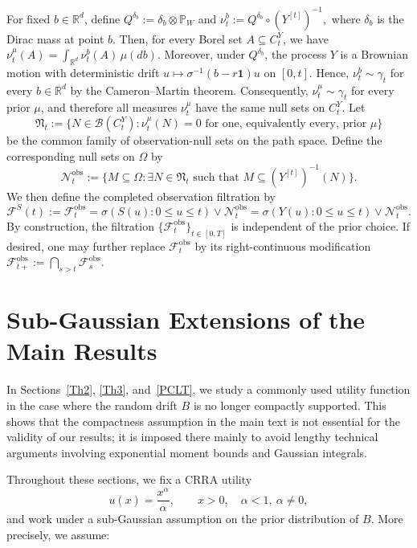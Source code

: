 \documentclass[11pt]{article}
\theoremstyle{definition}
\begin{document}
{For fixed $b\in\mathbb R^d$, define ${Q}^{\delta_b}
:=
\delta_b\otimes\mathbb{P}_W$ and $\nu_t^b
:=
{Q}^{\delta_b}\circ(Y^{[t]})^{-1},$
where $\delta_b$ is the Dirac mass at point $b$.
Then, for every Borel set $A\subseteq C_t^Y$, we have $\nu_t^\mu(A)
=
\int_{\mathbb R^d}\nu_t^b(A)\,\mu(db).$
Moreover, under ${Q}^{\delta_b}$, the process $Y$ is a Brownian
motion with deterministic drift
$u\mapsto\sigma^{-1}(b-r\mathbf 1)u$ on $[0,t]$.
Hence, $\nu_t^b\sim\gamma_t$
for every $b\in\mathbb R^d$ by the Cameron--Martin theorem.
Consequently, $\nu_t^\mu\sim\gamma_t$
for every prior $\mu$, and therefore all measures $\nu_t^\mu$ have the
same null sets on $C_t^Y$.
Let
\[
\mathfrak N_t
:=
\bigl\{
N\in\mathcal B(C_t^Y):
\nu_t^\mu(N)=0
\text{ for one, equivalently every, prior }\mu
\bigr\}
\]
be the common family of observation-null sets on the path space. Define
the corresponding null sets on $\Omega$ by
\[
\mathcal N_t^{\mathrm{obs}}
:=
\bigl\{
M\subseteq\Omega:
\exists N\in\mathfrak N_t
\text{ such that }
M\subseteq(Y^{[t]})^{-1}(N)
\bigr\}.
\]
We then define the completed observation filtration by
\[
\mathcal{F}^S(t)
:=
\mathcal F_t^{\mathrm{obs}}
=
\sigma(S(u):0\le u\le t)\vee\mathcal N_t^{\mathrm{obs}}
=
\sigma(Y(u):0\le u\le t)\vee\mathcal N_t^{\mathrm{obs}}.
\]
By construction, the filtration
$\{\mathcal F_t^{\mathrm{obs}}\}_{t\in[0,T]}$
is independent of the prior choice. If desired, one may further replace
$\mathcal F_t^{\mathrm{obs}}$ by its right-continuous modification $\mathcal F_{t+}^{\mathrm{obs}}
:=
\bigcap_{s>t}\mathcal F_s^{\mathrm{obs}}.$
}

\section{Sub-Gaussian Extensions of the Main Results}
\label{sec:subgaussian-overview}

In Sections~\ref{Th2}, \ref{Th3}, and~\ref{PCLT}, we study a commonly used
utility function in the case where the random drift $B$ is no longer
compactly supported. This shows that the compactness assumption in the
main text is not essential for the validity of our results; it is
imposed there mainly to avoid lengthy technical arguments involving
exponential moment bounds and Gaussian integrals.

Throughout these sections, we fix a CRRA utility
\begin{equation}
  \label{eq:CRRA-appendix}
  u(x) = \frac{x^{\alpha}}{\alpha}, 
  \qquad x>0,\quad \alpha<1,\ \alpha\neq 0,
\end{equation}
and work under a sub-Gaussian assumption on the prior distribution of
$B$. More precisely, we assume:
\end{document}
